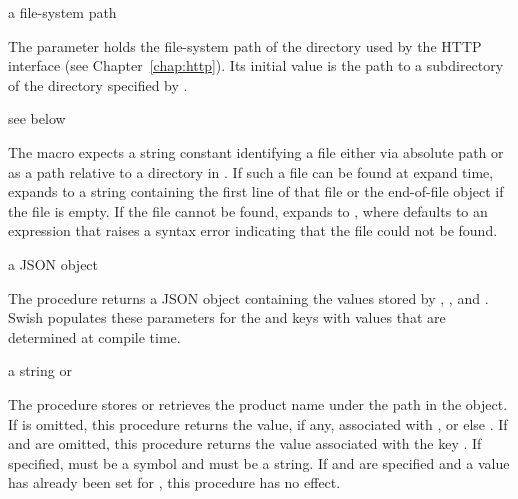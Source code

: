 \begin{parameter}
\end{parameter}
\hasvalue{} a file-system path

The  parameter holds the file-system path of the directory
used by the HTTP interface (see Chapter~\ref{chap:http}).
Its initial value is the path to a  subdirectory of
the directory specified by .

\begin{syntax}
\end{syntax}
\returns{} see below

The  macro expects a string constant 
identifying a file either via absolute path or as a path relative to a
directory in .
If such a file can be found at expand time,  expands to a
string containing the first line of that file or the end-of-file object if the
file is empty.
If the file cannot be found,  expands to
, where  defaults to an
expression that raises a syntax error indicating that the file could not be
found.

\begin{procedure}
\end{procedure}
\hasvalue{} a JSON object

The  procedure returns a JSON object containing the values
stored by
,
, and
.
Swish populates these parameters for the
 and  keys
with values that are determined at compile time.

\begin{parameter}
\end{parameter}
\hasvalue{} a string or 

The  procedure stores or retrieves the product
name under the path  in the
 object.
If  is omitted, this procedure returns the value, if any,
associated with , or else .
If  and  are omitted, this procedure returns the value
associated with the key .
If specified,  must be a symbol and  must be a string.
If  and  are specified and a value has already been
set for , this procedure has no effect.

